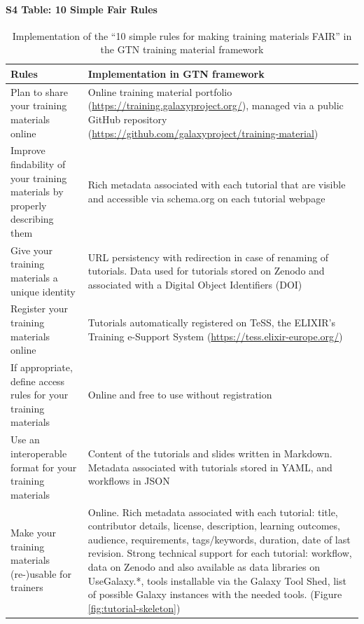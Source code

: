 \documentclass[10pt,letterpaper]{article}
\begin{document}
\clearpage
\paragraph*{S4 Table: 10 Simple Fair Rules}
\begin{table}[h!]
	\centering
    \caption{Implementation of the ``10 simple rules for making training materials FAIR'' \cite{Garcia2020} in the GTN training material framework
    \label{tbl:rulesforfair}}
	\begin{tabular}{p{}p{}}
		\textbf{Rules}                                                                & \textbf{Implementation in GTN framework}\\\hline
		Plan to share your training materials online                                  & Online training material portfolio (\url{https://training.galaxyproject.org/}), managed via a public GitHub repository (\url{https://github.com/galaxyproject/training-material})\\
		Improve findability of your training materials by properly describing them    & Rich metadata associated with each tutorial that are visible and accessible via schema.org on each tutorial webpage\\
		Give your training materials a unique identity                                & URL persistency with redirection in case of renaming of tutorials.
		Data used for tutorials stored on Zenodo and associated with a Digital Object Identifiers (DOI) \\
        Register your training materials online                                       & Tutorials automatically registered on TeSS, the ELIXIR's Training e-Support System (\url{https://tess.elixir-europe.org/})  \\
        If appropriate, define access rules for your training materials               &	Online and free to use without registration \\
        Use an interoperable format for your training materials                       &	Content of the tutorials and slides written in Markdown. Metadata associated with tutorials stored in YAML, and workflows in JSON\\
		Make your training materials (re-)usable for trainers                          & Online. Rich metadata associated with each tutorial: title, contributor details, license, description, learning outcomes, audience, requirements, tags/keywords, duration, date of last revision. Strong technical support for each tutorial: workflow, data on Zenodo and also available as data libraries on UseGalaxy.*, tools installable via the Galaxy Tool Shed, list of possible Galaxy instances with the needed tools. (Figure \ref{fig:tutorial-skeleton})\\

\end{tabular}
\end{table}
\end{document}
